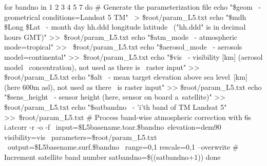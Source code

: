 \begin{smallverbatim}
for bandno in 1 2 3 4 5 7
do # Generate the parameterization file
	echo "\$geom                            \
         - geometrical conditions=Landsat 5 TM" \
         > \$root/param\_L5.txt
	echo "\$mdh \$Long \$Lat   \
         - month day hh.ddd longitude latitude \
         ("hh.ddd" is in decimal hours GMT)" >>\
         \$root/param\_L5.txt
	echo "\$atm\_mode                       \
         - atmospheric mode=tropical" >> \
         \$root/param\_L5.txt
	echo "\$aerosol\_mode                   \
         - aerosols model=continental" >>\
         \$root/param\_L5.txt
	echo "\$vis                           \
         - visibility [km] (aerosol model \
         concentration), not used as there is \
         raster input" >> \$root/param\_L5.txt
	echo "\$alt                       \
         - mean target elevation above sea level\
         [km] (here 600m asl), not used as there \
         is raster input" >> \$root/param\_L5.txt
	echo "\$sens\_height                     \
         - sensor height (here, sensor on board a\
         satellite)" >> \$root/param\_L5.txt
	echo "\$satbandno                        \
         - 'i'th band of TM Landsat 5" >>\
         \$root/param\_L5.txt
	# Process band-wise atmospheric correction with 6s
	i.atcorr -r -o -f \
         input=\$L5basename.toar.\$bandno\
         elevation=dem90 visibility=vis \
         parameters=\$root/param\_L5.txt \
         output=\$L5basename.surf.\$bandno \
         range=0,1 rescale=0,1 --overwrite
	# Increment satellite band number 
	satbandno=\$((satbandno+1))
done  
\end{smallverbatim}


\address{GRASS Development Team\\
  \url{http://grass.osgeo.org}\\
  \email{tmitchell@osgeo.org}}


